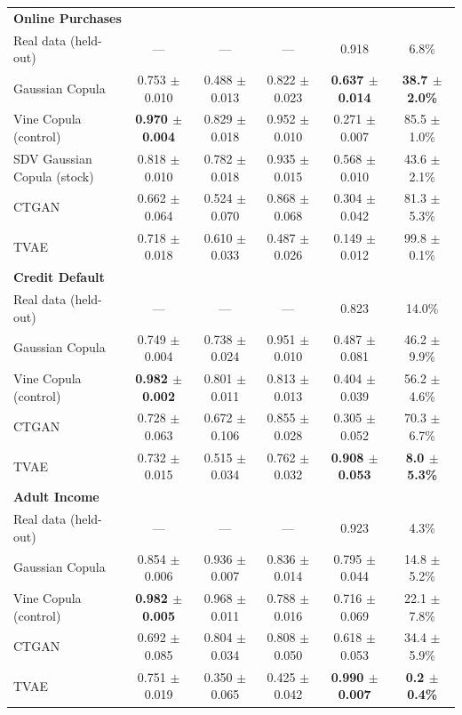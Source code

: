 \documentclass[pdflatex,sn-mathphys-num]{sn-jnl}
\theoremstyle{thmstyleone}%
\theoremstyle{thmstyletwo}%
\theoremstyle{thmstylethree}%
\begin{document}
\begin{table}[htbp]
\begin{tabular}{@{}lccccc@{}}
\midrule
\multicolumn{6}{l}{\textbf{Online Purchases}} \\
\quad Real data (held-out) & --- & --- & --- & 0.918 & 6.8\% \\
\quad Gaussian Copula & 0.753 $\pm$ 0.010 & 0.488 $\pm$ 0.013 & 0.822 $\pm$ 0.023 & \textbf{0.637 $\pm$ 0.014} & \textbf{38.7 $\pm$ 2.0\%} \\
\quad Vine Copula (control) &\textbf{0.970 $\pm$ 0.004} & 0.829 $\pm$ 0.018 & 0.952 $\pm$ 0.010 & 0.271 $\pm$ 0.007 & 85.5 $\pm$ 1.0\% \\
\quad SDV Gaussian Copula (stock) & 0.818 $\pm$ 0.010 & 0.782 $\pm$ 0.018 & 0.935 $\pm$ 0.015 & 0.568 $\pm$ 0.010 & 43.6 $\pm$ 2.1\% \\
\quad CTGAN           & 0.662 $\pm$ 0.064 & 0.524 $\pm$ 0.070 & 0.868 $\pm$ 0.068 & 0.304 $\pm$ 0.042 & 81.3 $\pm$ 5.3\% \\
\quad TVAE            & 0.718 $\pm$ 0.018 & 0.610 $\pm$ 0.033 & 0.487 $\pm$ 0.026 & 0.149 $\pm$ 0.012 & 99.8 $\pm$ 0.1\% \\
\midrule
\multicolumn{6}{l}{\textbf{Credit Default}} \\
\quad Real data (held-out) & --- & --- & --- & 0.823 & 14.0\% \\
\quad Gaussian Copula & 0.749 $\pm$ 0.004 & 0.738 $\pm$ 0.024 & 0.951 $\pm$ 0.010 & 0.487 $\pm$ 0.081 & 46.2 $\pm$ 9.9\% \\
\quad Vine Copula (control) &\textbf{0.982 $\pm$ 0.002} & 0.801 $\pm$ 0.011 & 0.813 $\pm$ 0.013 & 0.404 $\pm$ 0.039 & 56.2 $\pm$ 4.6\% \\
\quad CTGAN           & 0.728 $\pm$ 0.063 & 0.672 $\pm$ 0.106 & 0.855 $\pm$ 0.028 & 0.305 $\pm$ 0.052 & 70.3 $\pm$ 6.7\% \\
\quad TVAE            & 0.732 $\pm$ 0.015 & 0.515 $\pm$ 0.034 & 0.762 $\pm$ 0.032 & \textbf{0.908 $\pm$ 0.053} & \textbf{8.0 $\pm$ 5.3\%} \\
\midrule
\multicolumn{6}{l}{\textbf{Adult Income}} \\
\quad Real data (held-out) & --- & --- & --- & 0.923 & 4.3\% \\
\quad Gaussian Copula & 0.854 $\pm$ 0.006 & 0.936 $\pm$ 0.007 & 0.836 $\pm$ 0.014 & 0.795 $\pm$ 0.044 & 14.8 $\pm$ 5.2\% \\
\quad Vine Copula (control) &\textbf{0.982 $\pm$ 0.005} & 0.968 $\pm$ 0.011 & 0.788 $\pm$ 0.016 & 0.716 $\pm$ 0.069 & 22.1 $\pm$ 7.8\% \\
\quad CTGAN           & 0.692 $\pm$ 0.085 & 0.804 $\pm$ 0.034 & 0.808 $\pm$ 0.050 & 0.618 $\pm$ 0.053 & 34.4 $\pm$ 5.9\% \\
\quad TVAE            & 0.751 $\pm$ 0.019 & 0.350 $\pm$ 0.065 & 0.425 $\pm$ 0.042 & \textbf{0.990 $\pm$ 0.007} & \textbf{0.2 $\pm$ 0.4\%} \\
\bottomrule
\end{tabular}
\end{table}
\end{document}
